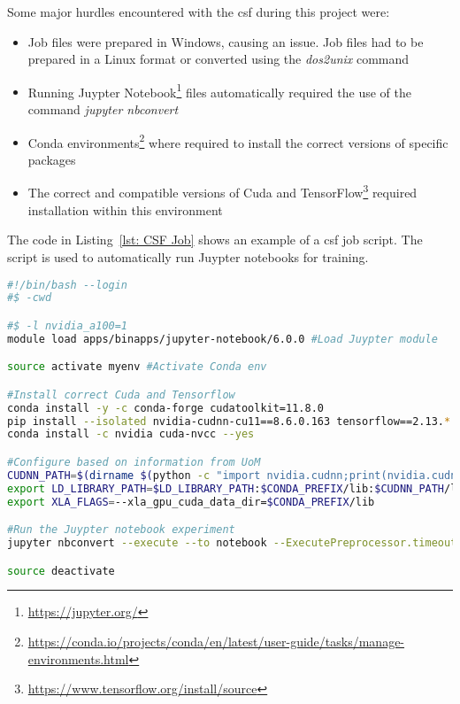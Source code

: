 Some major hurdles encountered with the \acrshort{csf} during this project were:
\begin{itemize}
  \item Job files were prepared in Windows, causing an issue. Job files had to be prepared in a Linux format or converted using the \textit{dos2unix} command
  \item Running Juypter Notebook\footnote{\url{https://jupyter.org/}} files automatically required the use of the command \textit{jupyter nbconvert}
  \item Conda environments\footnote{\url{https://conda.io/projects/conda/en/latest/user-guide/tasks/manage-environments.html}} where required to install the correct versions of specific packages
  \item The correct and compatible versions of Cuda and TensorFlow\footnote{\url{https://www.tensorflow.org/install/source}} required installation within this environment
\end{itemize}
The code in Listing~\ref{lst: CSF Job} shows an example of a \acrshort{csf} job script. The script is used to automatically run Juypter notebooks for training.
\begin{lstlisting}[language=Bash, caption={[Example of a CSF job script]{Example of a CSF job script. Here the CSF Juypter module is loaded: this allows Juypter-based commands to be run. Then, the Conda environment is activated and the correct packages are installed and configured, based on debug information from the University. The notebook is then run before the environment is deactivated again.}}, label={lst: CSF Job}]
#!/bin/bash --login
#$ -cwd

#$ -l nvidia_a100=1
module load apps/binapps/jupyter-notebook/6.0.0 #Load Juypter module

source activate myenv #Activate Conda env

#Install correct Cuda and Tensorflow
conda install -y -c conda-forge cudatoolkit=11.8.0
pip install --isolated nvidia-cudnn-cu11==8.6.0.163 tensorflow==2.13.*
conda install -c nvidia cuda-nvcc --yes

#Configure based on information from UoM
CUDNN_PATH=$(dirname $(python -c "import nvidia.cudnn;print(nvidia.cudnn.__file__)"))
export LD_LIBRARY_PATH=$LD_LIBRARY_PATH:$CONDA_PREFIX/lib:$CUDNN_PATH/lib
export XLA_FLAGS=--xla_gpu_cuda_data_dir=$CONDA_PREFIX/lib

#Run the Juypter notebook experiment
jupyter nbconvert --execute --to notebook --ExecutePreprocessor.timeout=-1 --inplace proj_code/colabs/Train\ Video\ Based.ipynb

source deactivate
\end{lstlisting}
